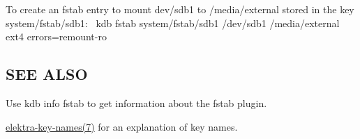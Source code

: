 To create an fstab entry to mount {\ttfamily dev/sdb1} to {\ttfamily /media/external} stored in the key {\ttfamily system/fstab/sdb1}\+:~\newline
 {\ttfamily kdb fstab system/fstab/sdb1 /dev/sdb1 /media/external ext4 errors=remount-\/ro}

\subsection*{S\+EE A\+L\+SO}


\begin{DoxyItemize}
\item Use {\ttfamily kdb info fstab} to get information about the fstab plugin.
\item \hyperlink{md_doc_help_elektra-key-names_doc_help_elektra-key-names_md}{elektra-\/key-\/names(7)} for an explanation of key names. 
\end{DoxyItemize}